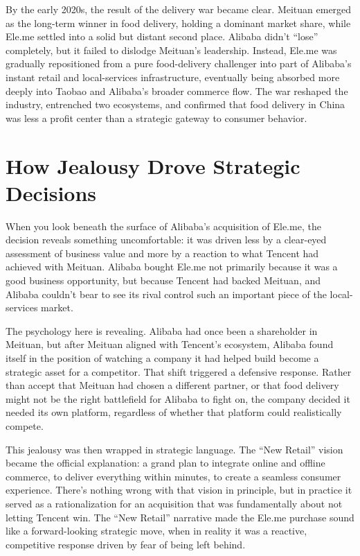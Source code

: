 By the early 2020s, the result of the delivery war became clear. Meituan emerged as the long-term winner in food delivery, holding a dominant market share, while Ele.me settled into a solid but distant second place. Alibaba didn't ``lose'' completely, but it failed to dislodge Meituan's leadership. Instead, Ele.me was gradually repositioned from a pure food-delivery challenger into part of Alibaba's instant retail and local-services infrastructure, eventually being absorbed more deeply into Taobao and Alibaba's broader commerce flow. The war reshaped the industry, entrenched two ecosystems, and confirmed that food delivery in China was less a profit center than a strategic gateway to consumer behavior.

\section{How Jealousy Drove Strategic Decisions}

When you look beneath the surface of Alibaba's acquisition of Ele.me, the decision reveals something uncomfortable: it was driven less by a clear-eyed assessment of business value and more by a reaction to what Tencent had achieved with Meituan. Alibaba bought Ele.me not primarily because it was a good business opportunity, but because Tencent had backed Meituan, and Alibaba couldn't bear to see its rival control such an important piece of the local-services market.

The psychology here is revealing. Alibaba had once been a shareholder in Meituan, but after Meituan aligned with Tencent's ecosystem, Alibaba found itself in the position of watching a company it had helped build become a strategic asset for a competitor. That shift triggered a defensive response. Rather than accept that Meituan had chosen a different partner, or that food delivery might not be the right battlefield for Alibaba to fight on, the company decided it needed its own platform, regardless of whether that platform could realistically compete.

This jealousy was then wrapped in strategic language. The ``New Retail'' vision became the official explanation: a grand plan to integrate online and offline commerce, to deliver everything within minutes, to create a seamless consumer experience. There's nothing wrong with that vision in principle, but in practice it served as a rationalization for an acquisition that was fundamentally about not letting Tencent win. The ``New Retail'' narrative made the Ele.me purchase sound like a forward-looking strategic move, when in reality it was a reactive, competitive response driven by fear of being left behind.

